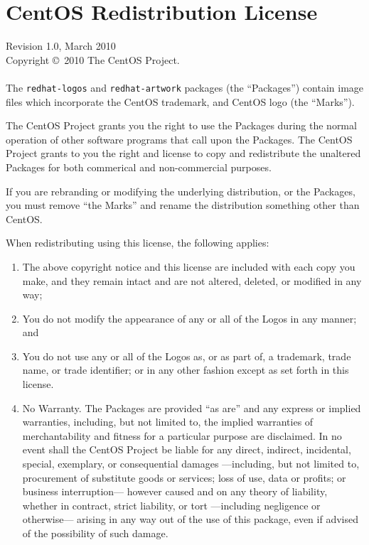 %
%
\chapter{CentOS Redistribution License}
\noindent Revision 1.0, March 2010\\
\noindent Copyright \copyright\ 2010 The CentOS Project.\\
\\
\noindent The \texttt{redhat-logos} and \texttt{redhat-artwork}
packages (the ``Packages'') contain image files which incorporate the
CentOS trademark, and CentOS logo (the ``Marks'').

The CentOS Project grants you the right to use the Packages during the
normal operation of other software programs that call upon the
Packages.  The CentOS Project grants to you the right and license to
copy and redistribute the unaltered Packages for both commerical and
non-commercial purposes.

If you are rebranding or modifying the underlying distribution, or the
Packages, you must remove ``the Marks'' and rename the distribution
something other than CentOS.

When redistributing using this license, the following applies:

\begin{enumerate}

\item The above copyright notice and this license are included with
each copy you make, and they remain intact and are not altered,
deleted, or modified in any way;

\item You do not modify the appearance of any or all of the Logos in
any manner; and

\item You do not use any or all of the Logos as, or as part of, a
trademark, trade name, or trade identifier; or in any other fashion
except as set forth in this license.

\item No Warranty. The Packages are provided ``as are'' and any
express or implied warranties, including, but not limited to, the
implied warranties of merchantability and fitness for a particular
purpose are disclaimed. In no event shall the CentOS Project be liable
for any direct, indirect, incidental, special, exemplary, or
consequential damages ---including, but not limited to, procurement of
substitute goods or services; loss of use, data or profits; or
business interruption--- however caused and on any theory of
liability, whether in contract, strict liability, or tort ---including
negligence or otherwise--- arising in any way out of the use of this
package, even if advised of the possibility of such damage.

\end{enumerate}


